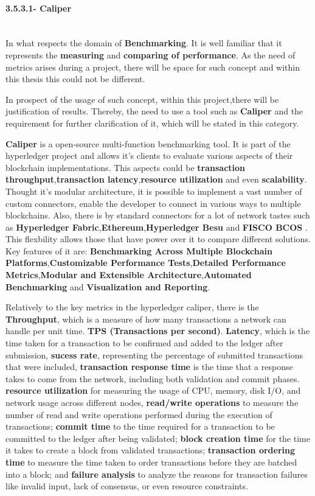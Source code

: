 \paragraph{3.5.3.1- Caliper}\mbox{}\\
In what respects the domain of \textbf{Benchmarking}. It is well familiar that it represents the \textbf{measuring} and \textbf{comparing of performance}. As the need of metrics arises during a project, there will be space for such concept and within this thesis this could not be different.

In prospect of the usage of such concept, within this project,there will be justification of results. Thereby, the need to use a tool such as \textbf{Caliper} and the requirement for further clarification of it, which will be stated in this category.

\textbf{Caliper} \cite{HyperledgerCaliper} is a open-source multi-function benchmarking tool. It is part of the hyperledger project and allows it's clients to evaluate various aspects of their blockchain implementations. This aspects could be \textbf{transaction throughput},\textbf{transaction latency},\textbf{resource utilization} and even \textbf{scalability}. Thought it's modular architecture, it is possible to implement a vast number of custom connectors, enable the developer to connect in various ways to multiple blockchains. Also, there is by standard connectors for a lot of network tastes such as \textbf{Hyperledger Fabric},\textbf{Ethereum},\textbf{Hyperledger Besu} \cite{HyperledgerBesu} and \textbf{FISCO BCOS} \cite{FISCOBCOS}. This flexbility allows those that have power over it to compare different solutions. Key features of it are: \textbf{Benchmarking Across Multiple Blockchain Platforms},\textbf{Customizable Performance Tests},\textbf{Detailed Performance Metrics},\textbf{Modular and Extensible Architecture},\textbf{Automated Benchmarking} and \textbf{Visualization and Reporting}.

Relatively to the key metrics in the hyperledger caliper, there is the \textbf{Throughput}, which is a measure of how many transactions a network can handle per unit time. \textbf{TPS (Transactions per second)}. \textbf{Latency}, which is the time taken for a transaction to be confirmed and added to the ledger after submission, \textbf{sucess rate}, representing the percentage of submitted transactions that were included, \textbf{transaction response time} is the time that a response takes to come from the network, including both validation and commit phases. \textbf{resource utilization} for measuring the usage of CPU, memory, disk I/O, and network usage across different nodes, \textbf{read/write operations} to measure the number of read and write operations performed during the execution of transactions; \textbf{commit time} to the time required for a transaction to be committed to the ledger after being validated; \textbf{block creation time} for the time it takes to create a block from validated transactions; \textbf{transaction ordering time} to measure the time taken to order transactions before they are batched into a block; and \textbf{failure analysis} to analyze the reasons for transaction failures like invalid input, lack of consensus, or even resource constraints.

